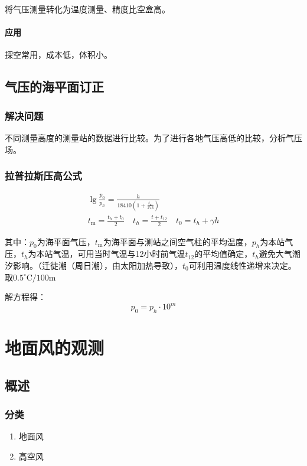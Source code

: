 \documentclass[UTF8,11pt]{ctexbook}
\begin{document}
将气压测量转化为温度测量、精度比空盒高。

\subsubsection{应用}

探空常用，成本低，体积小。

\section{气压的海平面订正}

\subsection{解决问题}

不同测量高度的测量站的数据进行比较。为了进行各地气压高低的比较，分析气压场。

\subsection{拉普拉斯压高公式}
\begin{gather}
    \lg\frac{p_0}{p_h}=\frac{h}{18410(1+\frac{t_\mathrm{m}}{273})}\\
    t_\mathrm{m}=\frac{t_h+t_0}{2}\quad t_h=\frac{t+t_{12}}{2}\quad t_0=t_h+\gamma h
\end{gather}

其中：\(p_0\)为海平面气压，\(t_\mathrm{m}\)为海平面与测站之间空气柱的平均温度，\(p_h\)为本站气压，\(t_h\)为本站气温，可用当时气温与12小时前气温\(t_{12}\)的平均值确定，\(t_h\)避免大气潮汐影响。（迁徙潮（周日潮），由太阳加热导致），\(t_0\)可利用温度线性递增来决定。取\(0.5^\circ\mathrm{C}/100\mathrm{m}\)

解方程得：
\[
p_0=p_h\cdot10^m
\]

\chapter{地面风的观测}

\section{概述}

\subsection{分类}
\begin{enumerate}
    \item 地面风
    \item 高空风
\end{enumerate}
\end{document}
